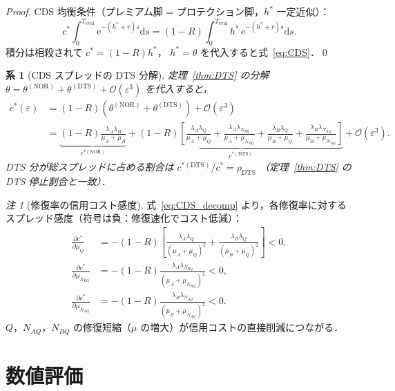\documentclass[12pt,a4paper]{article}
\theoremstyle{plain}
\newtheorem{corollary}[theorem]{系}
\theoremstyle{definition}
\theoremstyle{remark}
\newtheorem{remark}[theorem]{注}
\newcommand{\calO}{\mathcal{O}}        %
\newcommand{\eps}{\varepsilon}         %
\newcommand{\e}{\mathrm{e}}            %
\newcommand{\dd}{\mathrm{d}}
\newcommand{\thetaNOR}{\theta^{(\mathrm{NOR})}}
\newcommand{\thetaDTS}{\theta^{(\mathrm{DTS})}}
\newcommand{\rhoDTS}{\rho_{\mathrm{DTS}}}
\begin{document}
\begin{proof}
  CDS 均衡条件（プレミアム脚 = プロテクション脚，$h^*$ 一定近似）：
  \[
    c^*\int_0^{T_{\mathrm{eval}}}\e^{-(h^*+r)s}\dd s
    = (1-R)\int_0^{T_{\mathrm{eval}}}h^*\,\e^{-(h^*+r)s}\dd s.
  \]
  積分は相殺されて $c^* = (1-R)h^*$，
  $h^*=\theta$ を代入すると式~\eqref{eq:CDS}．\qed
\end{proof}

\begin{corollary}[CDS スプレッドの DTS 分解]\label{cor:CDS_DTS}
  定理~\ref{thm:DTS} の分解 $\theta = \thetaNOR + \thetaDTS + \calO(\eps^3)$
  を代入すると，
  \begin{align}
    c^*(\eps)
    &= (1-R)(\thetaNOR + \thetaDTS) + \calO(\eps^3)
    \nonumber\\
    &= \underbrace{(1-R)\frac{\lambda_A\lambda_B}{\mu_A+\mu_B}}_{c^{*(\mathrm{NOR})}}
    + \underbrace{(1-R)\left[\frac{\lambda_A\lambda_Q}{\mu_A+\mu_Q}
       + \frac{\lambda_A\lambda_{N_{BQ}}}{\mu_A+\mu_{N_{BQ}}}
       + \frac{\lambda_B\lambda_Q}{\mu_B+\mu_Q}
       + \frac{\lambda_B\lambda_{N_{AQ}}}{\mu_B+\mu_{N_{AQ}}}\right]}_{c^{*(\mathrm{DTS})}}
    + \calO(\eps^3).
    \label{eq:CDS_decomp}
  \end{align}
  DTS 分が総スプレッドに占める割合は $c^{*(\mathrm{DTS})}/c^* = \rhoDTS$
  （定理~\ref{thm:DTS} の DTS 停止割合と一致）．
\end{corollary}

\begin{remark}[修復率の信用コスト感度]
  式~\eqref{eq:CDS_decomp} より，各修復率に対するスプレッド感度（符号は負：修復速化でコスト低減）：
  \begin{align*}
    \frac{\partial c^*}{\partial \mu_Q}
    &= -(1-R)\!\left[
        \frac{\lambda_A\lambda_Q}{(\mu_A+\mu_Q)^2}
       +\frac{\lambda_B\lambda_Q}{(\mu_B+\mu_Q)^2}
      \right] < 0,\\
    \frac{\partial c^*}{\partial \mu_{N_{BQ}}}
    &= -(1-R)\frac{\lambda_A\lambda_{N_{BQ}}}{(\mu_A+\mu_{N_{BQ}})^2} < 0,\\
    \frac{\partial c^*}{\partial \mu_{N_{AQ}}}
    &= -(1-R)\frac{\lambda_B\lambda_{N_{AQ}}}{(\mu_B+\mu_{N_{AQ}})^2} < 0.
  \end{align*}
  $Q$，$N_{AQ}$，$N_{BQ}$ の修復短縮（$\mu$ の増大）が信用コストの直接削減につながる．
\end{remark}

\section{数値評価}\label{sec:numerical}
\end{document}

